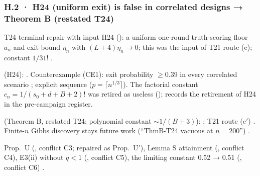 \subsubsection*{H.2 · H24 (uniform exit) is false in correlated designs → Theorem B (restated T24)}
\begin{description}[leftmargin=1.3em,style=unboxed,font=\normalfont]
\item[\textbf{Claim.}] T24 terminal repair with input H24 (): a uniform one-round truth-scoring floor $a_n$ and exit bound $\eta_n$ with $(L+4)\eta_n\to0$; this was the input of T21 route (e); constant $1/31!$ .
\item[\textbf{Failed.}]  (H24):  . Counterexample  (CE1): exit probability $\ge 0.39$ in every correlated scenario ; explicit sequence  ($p=\lceil n^{1/3}\rceil$). The factorial constant $c_n=1/(s_0+d+B+2)!$ was retired as useless ();  records the retirement of H24 in the pre-campaign register.
\item[\textbf{Replacement.}]  (Theorem B, restated T24; polynomial constant $\sim 1/(B+3)$):  ; T21 route (e$'$) . Finite-$n$ Gibbs discovery stays future work  (``ThmB-T24 vacuous at $n=200$'') .
\item[\textbf{Side errors (Astra).}] Prop.~U (, conflict C3; repaired as Prop.~U$'$), Lemma S attainment (, conflict C4), E3(ii) without $q<1$ (, conflict C5), the limiting constant 0.52 → 0.51 (, conflict C6) .
\end{description}

